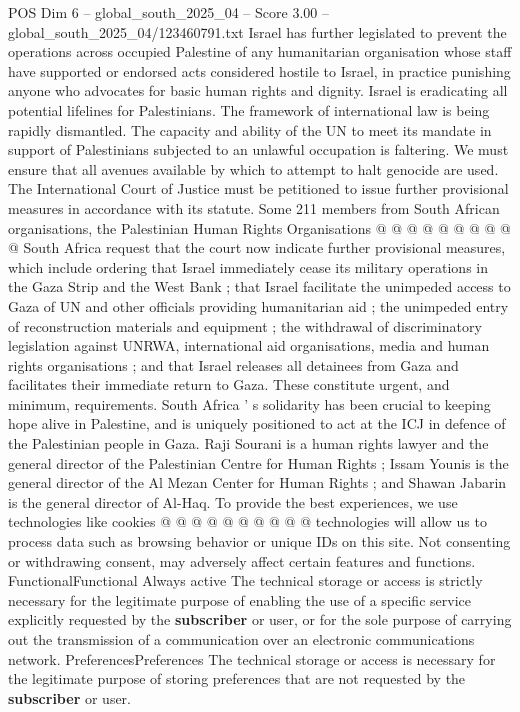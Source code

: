 \begin{textsample}{POS Dim 6 – global\_south\_2025\_04 – Score 3.00 – global\_south\_2025\_04/123460791.txt}
Israel has further legislated to prevent the operations across occupied Palestine of any humanitarian organisation whose staff have supported or endorsed acts considered hostile to Israel, in practice punishing anyone who advocates for basic human rights and dignity.
Israel is eradicating all potential lifelines for Palestinians.
The framework of international law is being rapidly dismantled.
The capacity and ability of the UN to meet its mandate in support of Palestinians subjected to an unlawful occupation is faltering.
We must ensure that all avenues available by which to attempt to halt genocide are used.
The International Court of Justice must be petitioned to issue further provisional measures in accordance with its statute.
Some 211 members from South African organisations, the Palestinian Human Rights Organisations @ @ @ @ @ @ @ @ @ @ South Africa request that the court now indicate further provisional measures, which include ordering that Israel immediately cease its military operations in the Gaza Strip and the West Bank ; that Israel facilitate the unimpeded access to Gaza of UN and other officials providing humanitarian aid ; the unimpeded entry of reconstruction materials and equipment ; the withdrawal of discriminatory legislation against UNRWA, international aid organisations, media and human rights organisations ; and that Israel releases all detainees from Gaza and facilitates their immediate return to Gaza.
These constitute urgent, and minimum, requirements.
South Africa ' s solidarity has been crucial to keeping hope alive in Palestine, and is uniquely positioned to act at the ICJ in defence of the Palestinian people in Gaza.
Raji Sourani is a human rights lawyer and the general director of the Palestinian Centre for Human Rights ; Issam Younis is the general director of the Al Mezan Center for Human Rights ; and Shawan Jabarin is the general director of Al-Haq.
To provide the best experiences, we use technologies like cookies @ @ @ @ @ @ @ @ @ @ technologies will allow us to process data such as browsing behavior or unique IDs on this site.
Not consenting or withdrawing consent, may adversely affect certain features and functions.
FunctionalFunctional Always active The technical storage or access is strictly necessary for the legitimate purpose of enabling the use of a specific service explicitly requested by the \textbf{subscriber} or user, or for the sole purpose of carrying out the transmission of a communication over an electronic communications network.
PreferencesPreferences The technical storage or access is necessary for the legitimate purpose of storing preferences that are not requested by the \textbf{subscriber} or user.

\end{textsample}

